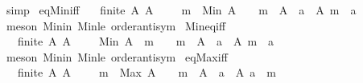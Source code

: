 \begin{isabellebody}
\ simp\isanewline
{}\isamarkupfalse%
%
\endisatagproof
{\isafoldproof}%
%
\isadelimproof
\isanewline
%
\endisadelimproof
\isanewline
{}\isamarkupfalse%
\ eq{\isacharunderscore}{\kern0pt}Min{\isacharunderscore}{\kern0pt}iff{\isacharcolon}{\kern0pt}\isanewline
\ \ {\isachardoublequoteopen}{\isasymlbrakk}\ finite\ A{\isacharsemicolon}{\kern0pt}\ A\ {\isasymnoteq}\ {\isacharbraceleft}{\kern0pt}{\isacharbraceright}{\kern0pt}\ {\isasymrbrakk}\ {\isasymLongrightarrow}\ m\ {\isacharequal}{\kern0pt}\ Min\ A\ \ {\isasymlongleftrightarrow}\ \ m\ {\isasymin}\ A\ {\isasymand}\ {\isacharparenleft}{\kern0pt}{\isasymforall}a\ {\isasymin}\ A{\isachardot}{\kern0pt}\ m\ {\isasymle}\ a{\isacharparenright}{\kern0pt}{\isachardoublequoteclose}\isanewline
%
\isadelimproof
%
\endisadelimproof
%
\isatagproof
{}\isamarkupfalse%
\ {\isacharparenleft}{\kern0pt}meson\ Min{\isacharunderscore}{\kern0pt}in\ Min{\isacharunderscore}{\kern0pt}le\ order{\isachardot}{\kern0pt}antisym{\isacharparenright}{\kern0pt}%
\endisatagproof
{\isafoldproof}%
%
\isadelimproof
\isanewline
%
\endisadelimproof
\isanewline
{}\isamarkupfalse%
\ Min{\isacharunderscore}{\kern0pt}eq{\isacharunderscore}{\kern0pt}iff{\isacharcolon}{\kern0pt}\isanewline
\ \ {\isachardoublequoteopen}{\isasymlbrakk}\ finite\ A{\isacharsemicolon}{\kern0pt}\ A\ {\isasymnoteq}\ {\isacharbraceleft}{\kern0pt}{\isacharbraceright}{\kern0pt}\ {\isasymrbrakk}\ {\isasymLongrightarrow}\ Min\ A\ {\isacharequal}{\kern0pt}\ m\ \ {\isasymlongleftrightarrow}\ \ m\ {\isasymin}\ A\ {\isasymand}\ {\isacharparenleft}{\kern0pt}{\isasymforall}a\ {\isasymin}\ A{\isachardot}{\kern0pt}\ m\ {\isasymle}\ a{\isacharparenright}{\kern0pt}{\isachardoublequoteclose}\isanewline
%
\isadelimproof
%
\endisadelimproof
%
\isatagproof
{}\isamarkupfalse%
\ {\isacharparenleft}{\kern0pt}meson\ Min{\isacharunderscore}{\kern0pt}in\ Min{\isacharunderscore}{\kern0pt}le\ order{\isachardot}{\kern0pt}antisym{\isacharparenright}{\kern0pt}%
\endisatagproof
{\isafoldproof}%
%
\isadelimproof
\isanewline
%
\endisadelimproof
\isanewline
{}\isamarkupfalse%
\ eq{\isacharunderscore}{\kern0pt}Max{\isacharunderscore}{\kern0pt}iff{\isacharcolon}{\kern0pt}\isanewline
\ \ {\isachardoublequoteopen}{\isasymlbrakk}\ finite\ A{\isacharsemicolon}{\kern0pt}\ A\ {\isasymnoteq}\ {\isacharbraceleft}{\kern0pt}{\isacharbraceright}{\kern0pt}\ {\isasymrbrakk}\ {\isasymLongrightarrow}\ m\ {\isacharequal}{\kern0pt}\ Max\ A\ \ {\isasymlongleftrightarrow}\ \ m\ {\isasymin}\ A\ {\isasymand}\ {\isacharparenleft}{\kern0pt}{\isasymforall}a\ {\isasymin}\ A{\isachardot}{\kern0pt}\ a\ {\isasymle}\ m{\isacharparenright}{\kern0pt}{\isachardoublequoteclose}\isanewline

\end{isabellebody}
